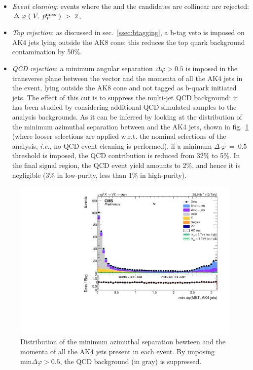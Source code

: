\begin{itemize}
     \item \textit{Event cleaning}: events where the \V and the \Z candidates are collinear are rejected:\\$\Delta~\varphi~(~V,~\vec{p}_T^{\text{miss}}~)~>~2$.
     \item \textit{Top rejection}: as discussed in sec.~\ref{ssec:btagging}, a b-tag veto is imposed on AK4 jets lying outside the AK8 cone; this reduces the top quark background contamination by 50\%.
     \item \textit{QCD rejection}: a minimum angular separation $\Delta \varphi>0.5$ is imposed in the transverse plane between the \met vector and the momenta of all the AK4 jets in the event, lying outside the AK8 cone and not tagged as b-quark initiated jets. The effect of this cut is to suppress the multi-jet QCD background: it has been studied by considering additional QCD simulated samples to the analysis backgrounds. As it can be inferred by looking at the distribution of the minimum azimuthal separation between \met and the AK4 jets, shown in fig.~\ref{fig:QCD_cleaning} (where looser selections are applied w.r.t. the nominal selections of the analysis, \textit{i.e.}, no QCD event cleaning is performed), if a minimum $\Delta~\varphi~=~0.5$ threshold is imposed, the QCD contribution is reduced from 32\% to 5\%. In the final signal region, the QCD event yield amounts to 2\%, and hence it is negligible (3\% in low-purity, less than 1\% in high-purity).
\end{itemize}

\begin{figure}[!htb]
  \centering
    \includegraphics[width=.495\textwidth]{figures/MinJetMetDPhi.pdf}
  \caption{Distribution of the minimum azimuthal separation bewteen \met and the momenta of all the AK4 jets present in each event. By imposing $\text{min} \Delta \varphi > 0.5$, the QCD background (in gray) is suppressed.}
  \label{fig:QCD_cleaning}
\end{figure}

\vspace*{1\baselineskip}

